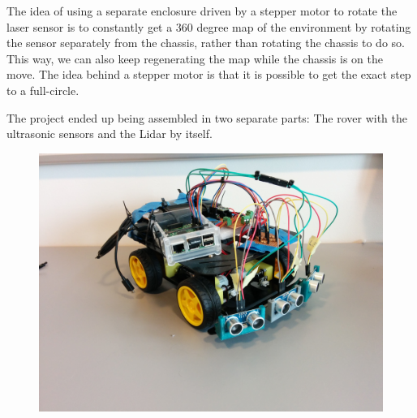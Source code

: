 The idea of using a separate enclosure driven by a stepper motor to rotate the laser sensor is to constantly get a 360 degree map of the environment by rotating the sensor separately from the chassis, rather than rotating the chassis to do so. This way, we can also keep regenerating the map while the chassis is on the move.  The idea behind a stepper motor is that it is possible to get the exact step to a full-circle.

The project ended up being assembled in two separate parts: The rover with the ultrasonic sensors and the Lidar by itself.

\begin{figure}[H]
	\centering
	\includegraphics[width=.6\linewidth]{images/build_ultrasonic.jpg}
\end{figure}